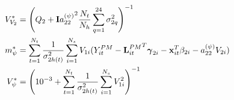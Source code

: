 \documentclass[alpha-refs]{wiley-article}
\newcommand{\bbeta}{ \mbox{\boldmath $ \beta $} }
\newcommand{\bpsi}{ \mbox{\boldmath $\psi$} }
\newcommand{\bgamma}{ \mbox{\boldmath $\gamma$} }
\newcommand{\bI}{\textbf{I}}
\newcommand{\bL}{\textbf{L}}
\newcommand{\bx}{\textbf{x}}
\newcommand{\bX}{\textbf{X}}
\begin{document}
{\begin{align*}
V_{V_2}^* &= \left( Q_2 + \bI {a_{22}^{(\psi)}}^2 \frac{ N_t }{N_h} \sum_{q=1}^{24} \sigma^2_{2q} \right)^{-1} \\
 m_{\psi}^* &= \sum^{N_t}_{t=1} \frac{1}{\sigma^2_{2h(t)} } \sum^{N_s}_{i=1}  V_{1i} (Y^{PM}_{it} - {\bL^{PM}_{it}}^T\bgamma_{2i}- \bx_{it}^T \beta_{2i} - a^{(\psi)}_{22} V_{2i}  )\\
V_{\psi}^* &= \left( 10^{-3} +  \sum^{N_t}_{t=1} \frac{1}{\sigma^2_{2h(t)} }  \sum^{N_s}_{i=1} V_{1i}^2 \right)^{-1}
\end{align*}
}
%
%
\end{document}

